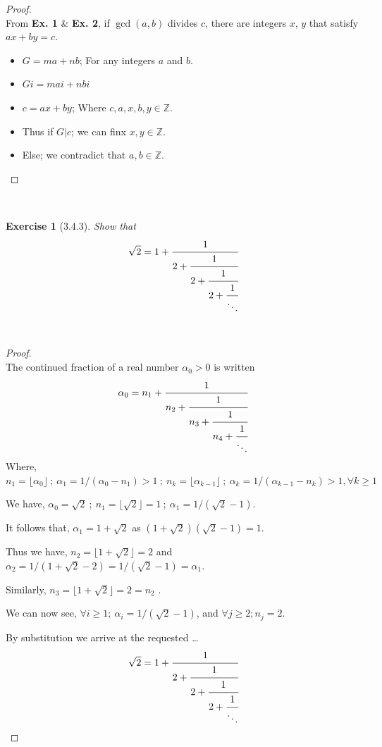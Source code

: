 \documentclass[12pt]{article}
\newcommand{\XB}{\color{black}}
\newcommand{\XBB}{\color{blue}}
\newcommand{\ds}{\displaystyle}
\theoremstyle{plain}
\newtheorem{ex}{Exercise}
\begin{document}
\begin{proof}
  \ \\

  From \textbf{Ex. 1} \& \textbf{Ex. 2}, if $\gcd(a,b)$ divides $c$, there are integers $x$, $y$ that satisfy $ax + by = c$.

  \begin{itemize}
    \item $ \ds G = ma + nb $; For any integers $a$ and $b$.
    \item $ \ds Gi = mai + nbi $
    \item $ \ds c = ax + by $; Where $ c,a,x,b,y \in \mathbb{Z} $.
    \item Thus if $ G | c $; we can finx $ x,y \in \mathbb{Z} $.
    \item Else; we contradict that $ a,b \in \mathbb{Z} $.
  \end{itemize}

\end{proof}

\newpage

\XBB\hrulefill\XB \\
\begin{ex} [3.4.3]
  Show that
  \[
    \sqrt{2} = 1 + \cfrac{1}{2 + \cfrac{1}{2 + \cfrac{1}{2 + \cfrac{1}{\ddots}}}}
  \]
\end{ex}
\XBB\hrulefill\XB \\

\begin{proof}
  \ \\

  The continued fraction of a real number $ \alpha_{0} > 0 $ is written
  \[
    \alpha_{0} = n_{1} + \cfrac{1}{n_{2} + \cfrac{1}{n_{3} + \cfrac{1}{n_{4} + \cfrac{1}{\ddots}}}}
  \]
  Where, $ n_{1} = \lfloor \alpha_{0} \rfloor \ ; \ \alpha_{1} = 1/(\alpha_{0} - n_{1}) > 1 \ ; \ n_{k} = \lfloor \alpha_{k-1} \rfloor \ ; \ \alpha_{k} = 1/(\alpha_{k-1} - n_{k}) > 1, \forall k \ge 1 $

  We have, $ \alpha_{0} = \sqrt{2} \ ; \ n_{1} = \lfloor \sqrt{2} \rfloor = 1 \ ; \ \alpha_{1} = 1/(\sqrt{2} - 1) $.

  It follows that, $ \alpha_{1} = 1 + \sqrt{2} $ as $ (1 + \sqrt{2})(\sqrt{2} - 1) = 1 $.

  Thus we have, $ n_{2} = \lfloor 1 + \sqrt{2} \rfloor = 2 $ and $ \alpha_{2} = 1/(1 + \sqrt{2} - 2) = 1/(\sqrt{2} - 1) = \alpha_{1} $.

  Similarly, $ n_{3} = \lfloor 1 + \sqrt{2} \rfloor = 2 = n_{2} $ .

  We can now see, $ \forall i \ge 1 ; \ \alpha_{i} = 1/(\sqrt{2} - 1) $, and $ \forall j \ge 2 ; n_{j} = 2 $.

  By substitution we arrive at the requested \dots
  \[
    \sqrt{2} = 1 + \cfrac{1}{2 + \cfrac{1}{2 + \cfrac{1}{2 + \cfrac{1}{\ddots}}}}
  \]
\end{proof}
\end{document}
